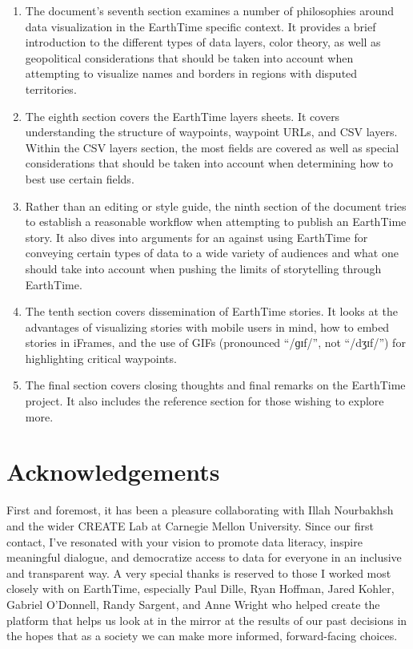 \documentclass[
]{krantz}
\begin{document}
\begin{enumerate}
\item
  The document's seventh section examines a number of philosophies around data visualization in the EarthTime specific context. It provides a brief introduction to the different types of data layers, color theory, as well as geopolitical considerations that should be taken into account when attempting to visualize names and borders in regions with disputed territories.
\item
  The eighth section covers the EarthTime layers sheets. It covers understanding the structure of waypoints, waypoint URLs, and CSV layers. Within the CSV layers section, the most fields are covered as well as special considerations that should be taken into account when determining how to best use certain fields.
\item
  Rather than an editing or style guide, the ninth section of the document tries to establish a reasonable workflow when attempting to publish an EarthTime story. It also dives into arguments for an against using EarthTime for conveying certain types of data to a wide variety of audiences and what one should take into account when pushing the limits of storytelling through EarthTime.
\item
  The tenth section covers dissemination of EarthTime stories. It looks at the advantages of visualizing stories with mobile users in mind, how to embed stories in iFrames, and the use of GIFs (pronounced ``/ɡɪf/'', not ``/dʒɪf/'') for highlighting critical waypoints.
\item
  The final section covers closing thoughts and final remarks on the EarthTime project. It also includes the reference section for those wishing to explore more.
\end{enumerate}

\hypertarget{acknowledgements}{%
\section*{Acknowledgements}\label{acknowledgements}}


First and foremost, it has been a pleasure collaborating with Illah Nourbakhsh and the wider CREATE Lab at Carnegie Mellon University. Since our first contact, I've resonated with your vision to promote data literacy, inspire meaningful dialogue, and democratize access to data for everyone in an inclusive and transparent way. A very special thanks is reserved to those I worked most closely with on EarthTime, especially Paul Dille, Ryan Hoffman, Jared Kohler, Gabriel O'Donnell, Randy Sargent, and Anne Wright who helped create the platform that helps us look at in the mirror at the results of our past decisions in the hopes that as a society we can make more informed, forward-facing choices.
\end{document}
